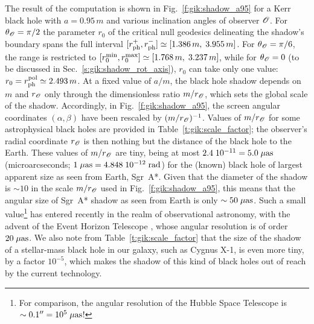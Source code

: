 The result of the computation is shown in
Fig.~\ref{f:gik:shadow_a95} for a Kerr black hole with
$a=0.95\, m$ and various inclination angles of observer $\mathscr{O}$.
For $\theta_{\mathscr{O}}=\pi/2$ the parameter $r_0$ of the critical null geodesics
delineating the shadow's boundary spans the full interval
$[r_{\rm ph}^+, r_{\rm ph}^-] \simeq [1.386\, m,\; 3.955\, m]$.
For $\theta_{\mathscr{O}}=\pi/6$, the range is restricted to
$[r_0^{\rm min}, r_0^{\rm max}] \simeq [1.768\, m,\;   3.237\, m]$,
while for $\theta_{\mathscr{O}}=0$ (to be discussed in Sec.~\ref{s:gik:shadow_rot_axis}),
$r_0$ can take only one value:
$r_0 = r_{\rm ph}^{\rm pol} \simeq 2.493\, m$.
At a fixed value of $a/m$, the black hole shadow depends on $m$ and $r_{\mathscr{O}}$
only through the dimensionless ratio $m/r_{\mathscr{O}}$, which sets the global scale of the shadow.
Accordingly, in Fig.~\ref{f:gik:shadow_a95}, the screen angular coordinates $(\alpha,\beta)$ have
been rescaled by $(m/r_{\mathscr{O}})^{-1}$.
Values of $m/r_{\mathscr{O}}$ for some astrophysical black holes are provided
in Table~\ref{t:gik:scale_factor}; the observer's radial coordinate $r_{\mathscr{O}}$ is then
nothing but the distance of the black hole to the Earth. These values of
$m/r_{\mathscr{O}}$ are tiny, being at most $2.4\; 10^{-11} = 5.0 \; \mu{\rm as}$
(microarcseconds; $1\; \mu{\rm as} = 4.848\; 10^{-12}\; {\rm rad}$)
for
the (known) black hole of largest apparent size as seen from Earth, Sgr~A*.
Given that the diameter of the shadow is $\sim 10$ in the scale
$m/r_{\mathscr{O}}$ used in Fig.~\ref{f:gik:shadow_a95}, this means that the
angular size of Sgr~A* shadow as seen from Earth is only $\sim 50\; \mu{\rm as}$.
Such a small value\footnote{For comparison, the angular resolution of the
Hubble Space Telescope is $\sim 0.1'' = 10^5\; \mu{\rm as}$!}
has entered recently in the realm of observational astronomy,
with the advent of the Event Horizon Telescope \cite{EHT19a},
whose angular resolution is of order $20\; \mu{\rm as}$.
We also note from Table~\ref{t:gik:scale_factor} that the size of the shadow
of a stellar-mass black hole in our galaxy, such as Cygnus X-1, is even more tiny,
by a factor $10^{-5}$, which makes the shadow of this kind of black holes out of reach
by the current technology.

